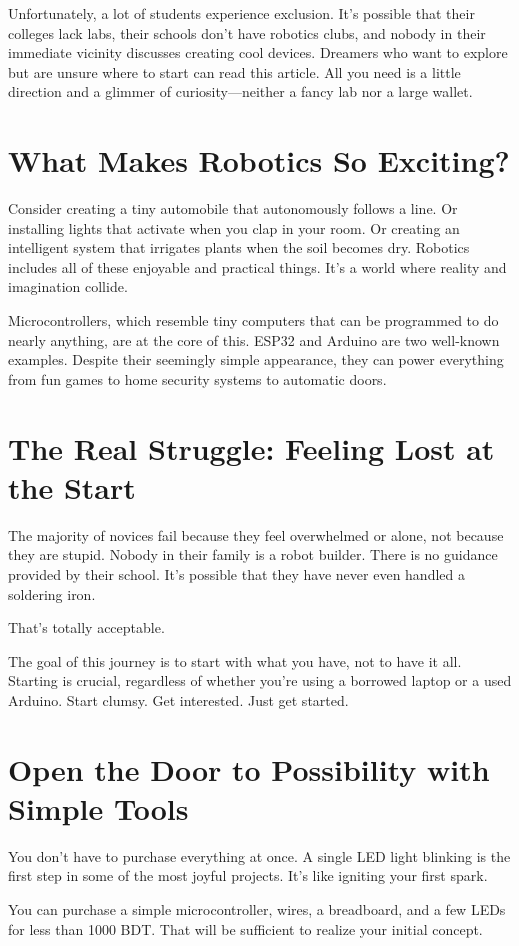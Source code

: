 \documentclass[a4paper,10pt,twocolumn]{memoir}
\begin{document}
Unfortunately, a lot of students experience exclusion. It’s possible that their colleges lack labs, their schools don’t have robotics clubs, and nobody in their immediate vicinity discusses creating cool devices. Dreamers who want to explore but are unsure where to start can read this article. All you need is a little direction and a glimmer of curiosity—neither a fancy lab nor a large wallet.
\section*{What Makes Robotics So Exciting?}
Consider creating a tiny automobile that autonomously follows a line. Or installing lights that activate when you clap in your room. Or creating an intelligent system that irrigates plants when the soil becomes dry. Robotics includes all of these enjoyable and practical things. It’s a world where reality and imagination collide.

Microcontrollers, which resemble tiny computers that can be programmed to do nearly anything, are at the core of this. ESP32 and Arduino are two well-known examples. Despite their seemingly simple appearance, they can power everything from fun games to home security systems to automatic doors.
\section*{The Real Struggle: Feeling Lost at the Start}
The majority of novices fail because they feel overwhelmed or alone, not because they are stupid. Nobody in their family is a robot builder. There is no guidance provided by their school. It’s possible that they have never even handled a soldering iron.

That’s totally acceptable.

The goal of this journey is to start with what you have, not to have it all. Starting is crucial, regardless of whether you’re using a borrowed laptop or a used Arduino. Start clumsy. Get interested. Just get started.
\section*{Open the Door to Possibility with Simple Tools}
You don’t have to purchase everything at once. A single LED light blinking is the first step in some of the most joyful projects. It’s like igniting your first spark.

You can purchase a simple microcontroller, wires, a breadboard, and a few LEDs for less than 1000 BDT. That will be sufficient to realize your initial concept.
\end{document}
